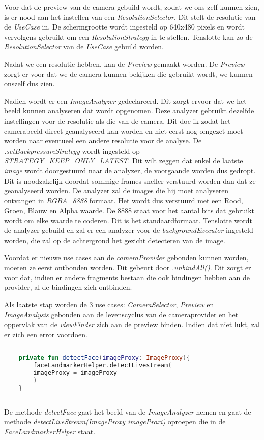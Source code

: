 Voor dat de preview van de camera gebuild wordt, zodat we ons zelf kunnen zien, is er nood aan het instellen van een \emph{ResolutionSelector}. Dit stelt de resolutie van de \emph{UseCase} in. De schermgrootte wordt ingesteld op 640x480 pixels en wordt vervolgens gebruikt om een \emph{ResolutionStrategy} in te stellen. Tenslotte kan zo de \emph{ResolutionSelector} van de \emph{UseCase} gebuild worden. 
 
Nadat we een resolutie hebben, kan de \emph{Preview} gemaakt worden. De \emph{Preview} zorgt er voor dat we de camera kunnen bekijken die gebruikt wordt, we kunnen onszelf dus zien. 

Nadien wordt er een \emph{ImageAnalyzer} gedeclareerd. Dit zorgt ervoor dat we het beeld kunnen analyseren dat wordt opgenomen. Deze analyzer gebruikt dezelfde instellingen voor de resolutie als die van de camera. Dit doe ik zodat het camerabeeld direct geanalyseerd kan worden en niet eerst nog omgezet moet worden naar eventueel een andere resolutie voor de analyse. De \emph{.setBackpressureStrategy} wordt ingesteld op \emph{STRATEGY\_KEEP\_ONLY\_LATEST}. Dit wilt zeggen dat enkel de laatste \emph{image} wordt doorgestuurd naar de analyzer, de voorgaande worden dus gedropt. Dit is noodzakelijk doordat sommige frames sneller verstuurd worden dan dat ze geanalyseerd worden. De analyzer zal de images die hij moet analyseren ontvangen in \emph{RGBA\_8888} formaat. Het wordt dus verstuurd met een Rood, Groen, Blauw en Alpha waarde. De 8888 staat voor het aantal bits dat gebruikt wordt om elke waarde te coderen. Dit is het standaardformaat. Tenslotte wordt de analyzer gebuild en zal er een analyzer voor de \emph{backgroundExecutor} ingesteld worden, die zal op de achtergrond het gezicht detecteren van de image.

Voordat er nieuwe use cases aan de \emph{cameraProvider} gebonden kunnen worden, moeten ze eerst ontbonden worden. Dit gebeurt door \emph{.unbindAll()}. Dit zorgt er voor dat, indien er andere fragments bestaan die ook bindingen hebben aan de provider, al de bindingen zich ontbinden.

Als laatste stap worden de 3 use cases: \emph{CameraSelector}, \emph{Preview} en \emph{ImageAnalysis} gebonden aan de levenscyclus van de cameraprovider en het oppervlak van de \emph{viewFinder} zich aan de preview binden. Indien dat niet lukt, zal er zich een error voordoen.

\begin{lstlisting}[language=Kotlin, caption=detectFace in CameraFragment.kt]
    
    private fun detectFace(imageProxy: ImageProxy){
        faceLandmarkerHelper.detectLivestream(
        imageProxy = imageProxy
        )
    }
    
\end{lstlisting}
De methode \emph{detectFace} gaat het beeld van de \emph{ImageAnalyzer} nemen en gaat de methode \emph{detectLiveStream(ImageProxy imageProxi)} oproepen die in de \emph{FaceLandmarkerHelper} staat.

